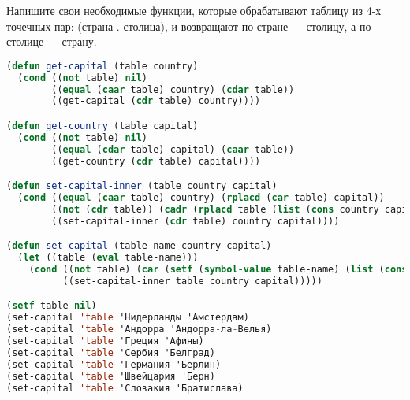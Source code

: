 Напишите свои необходимые функции, которые обрабатывают таблицу из 4-х
точечных пар: (страна . столица), и возвращают по стране --- столицу,
а по столице --- страну.

\begin{lstlisting}[language=Lisp]
(defun get-capital (table country)
  (cond ((not table) nil)
        ((equal (caar table) country) (cdar table))
        ((get-capital (cdr table) country))))

(defun get-country (table capital)
  (cond ((not table) nil)
        ((equal (cdar table) capital) (caar table))
        ((get-country (cdr table) capital))))

(defun set-capital-inner (table country capital)
  (cond ((equal (caar table) country) (rplacd (car table) capital))
        ((not (cdr table)) (cadr (rplacd table (list (cons country capital)))))
        ((set-capital-inner (cdr table) country capital))))

(defun set-capital (table-name country capital)
  (let ((table (eval table-name)))
    (cond ((not table) (car (setf (symbol-value table-name) (list (cons country capital)))))
          ((set-capital-inner table country capital)))))

(setf table nil)
(set-capital 'table 'Нидерланды 'Амстердам)
(set-capital 'table 'Андорра 'Андорра-ла-Велья)
(set-capital 'table 'Греция 'Афины)
(set-capital 'table 'Сербия 'Белград)
(set-capital 'table 'Германия 'Берлин)
(set-capital 'table 'Швейцария 'Берн)
(set-capital 'table 'Словакия 'Братислава)
\end{lstlisting}

